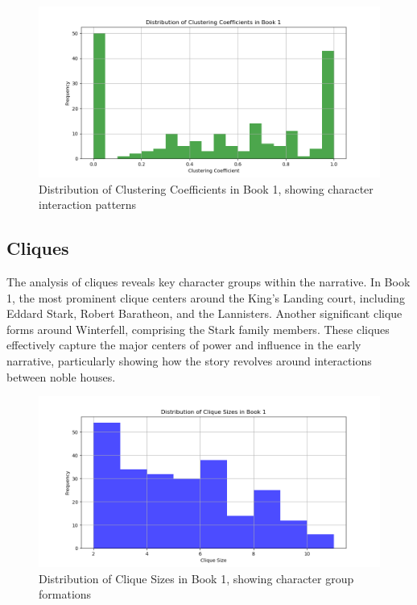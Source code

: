 \documentclass[12pt, a4paper]{article}
\begin{document}
\begin{figure}[H]
    \centering
    \includegraphics[width=1\linewidth]{clustering_book1.png}
    \caption{Distribution of Clustering Coefficients in Book 1, showing character interaction patterns}
    \label{fig:clustering}
\end{figure}

\subsection{Cliques}
The analysis of cliques reveals key character groups within the narrative. In Book 1, the most prominent clique centers around the King's Landing court, including Eddard Stark, Robert Baratheon, and the Lannisters. Another significant clique forms around Winterfell, comprising the Stark family members. These cliques effectively capture the major centers of power and influence in the early narrative, particularly showing how the story revolves around interactions between noble houses.

\begin{figure}[H]
    \centering
    \includegraphics[width=1\linewidth]{cliques_book1.png}
    \caption{Distribution of Clique Sizes in Book 1, showing character group formations}
    \label{fig:cliques}
\end{figure}
\end{document}
